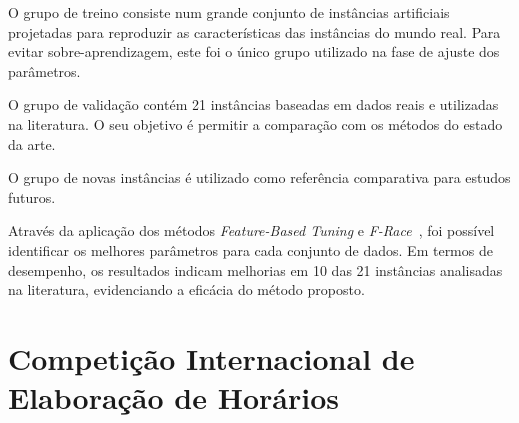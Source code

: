 \begin{compactenum}
    \item O grupo de treino consiste num grande conjunto de instâncias artificiais projetadas para reproduzir as características das instâncias do mundo real. Para evitar sobre-aprendizagem, este foi o único grupo utilizado na fase de ajuste dos parâmetros.
    
    \item O grupo de validação contém 21 instâncias baseadas em dados reais e utilizadas na literatura. O seu objetivo é permitir a comparação com os métodos do estado da arte.
    
    \item O grupo de novas instâncias é utilizado como referência comparativa para estudos futuros.
\end{compactenum}

Através da aplicação dos métodos \textit{Feature-Based Tuning} e \textit{F-Race}~\cite{FRaceIterated-Birattari-2010}, foi possível identificar os melhores parâmetros para cada conjunto de dados. Em termos de desempenho, os resultados indicam melhorias em 10 das 21 instâncias analisadas na literatura, evidenciando a eficácia do método proposto.







\section{Competição Internacional de Elaboração de Horários}
\label{capitulo2:ITC}

